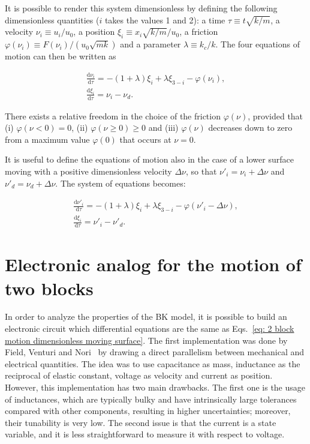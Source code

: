It is possible to render this system dimensionless by defining the following dimensionless quantities ($i$ takes the values 1 and 2):
a time $\tau\equiv t\sqrt{k/m}$, a velocity $\nu_i\equiv u_i/u_0$, a position $\xi_i\equiv x_i \sqrt{k/m}/u_0$,
a friction $\varphi(\nu_i)\equiv F(\nu_i)/(u_0\sqrt{mk})$ and a parameter $\lambda\equiv k_c/k$.
The four equations of motion can then be written as

\begin{equation}
\label{eq: 2 block motion dimensionless}
\begin{gathered}
    \frac{\text{d}\nu_i}{\text{d}\tau}=-(1+\lambda)\xi_i+\lambda\xi_{3-i}-\varphi(\nu_i),\\[10pt]
    \frac{\text{d}\xi_i}{\text{d}\tau}=\nu_i-\nu_d.
\end{gathered}
\end{equation}

There exists a relative freedom in the choice of the friction $\varphi(\nu)$, provided that
(i) $\varphi(\nu<0)=0$, (ii) $\varphi(\nu\geq0)\geq0$ and (iii) $\varphi(\nu)$ decreases down to zero from a
maximum value $\varphi(0)$ that occurs at $\nu=0$.

It is useful to define the equations of motion also in the case of a lower surface moving with a positive
dimensionless velocity $\Delta\nu$, so that $\nu'_i=\nu_i+\Delta\nu$ and $\nu'_d=\nu_d+\Delta\nu$.
The system of equations becomes:

\begin{equation}
    \label{eq: 2 block motion dimensionless moving surface}
    \begin{gathered}
        \frac{\text{d}\nu'_i}{\text{d}\tau}=-(1+\lambda)\xi_i+\lambda\xi_{3-i}-\varphi(\nu'_i-\Delta\nu),\\[10pt]
        \frac{\text{d}\xi_i}{\text{d}\tau}=\nu'_i-\nu'_d.
    \end{gathered}
\end{equation}


\section{Electronic analog for the motion of two blocks}\label{sec: electronic analog}

In order to analyze the properties of the BK model, it is possible to build an electronic circuit
which differential equations are the same as Eqs.~\ref{eq: 2 block motion dimensionless moving surface}.
The first implementation was done by Field, Venturi and Nori~\cite{ref:fvn} by drawing a direct parallelism
between mechanical and electrical quantities. The idea was to use capacitance as mass,
inductance as the reciprocal of elastic constant, voltage as velocity and current as position.
However, this implementation has two main drawbacks. The first one is the usage of inductances, which are typically
bulky and have intrinsically large tolerances compared with other components, resulting in higher uncertainties; moreover,
their tunability is very low. The second issue is that the current is a state variable, and it is less straightforward
to measure it with respect to voltage.

